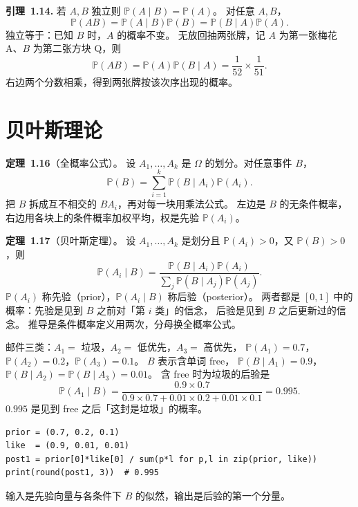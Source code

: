 \noindent\textbf{引理~1.14.}
若 $A,B$ 独立则 $\mathbb{P}(A\mid B)=\mathbb{P}(A)$。
对任意 $A,B$，
\begin{equation}
\mathbb{P}(AB)=\mathbb{P}(A\mid B)\mathbb{P}(B)=\mathbb{P}(B\mid A)\mathbb{P}(A).
\end{equation}
独立等于：已知 $B$ 时，$A$ 的概率不变。
无放回抽两张牌，记 $A$ 为第一张梅花 A、$B$ 为第二张方块 Q，则
\[
\mathbb{P}(AB)=\mathbb{P}(A)\mathbb{P}(B\mid A)=\frac{1}{52}\times\frac{1}{51}.
\]
右边两个分数相乘，得到两张牌按该次序出现的概率。

\section{贝叶斯理论}

\noindent\textbf{定理~1.16}（全概率公式）。
设 $A_1,\ldots,A_k$ 是 $\Omega$ 的划分。对任意事件 $B$，
\begin{equation}
\mathbb{P}(B)=\sum_{i=1}^{k}\mathbb{P}(B\mid A_i)\mathbb{P}(A_i).
\end{equation}
把 $B$ 拆成互不相交的 $BA_i$，再对每一块用乘法公式。
左边是 $B$ 的无条件概率，右边用各块上的条件概率加权平均，权是先验 $\mathbb{P}(A_i)$。

\noindent\textbf{定理~1.17}（贝叶斯定理）。
设 $A_1,\ldots,A_k$ 是划分且 $\mathbb{P}(A_i)>0$，又 $\mathbb{P}(B)>0$，则
\begin{equation}
\mathbb{P}(A_i\mid B)
=\frac{\mathbb{P}(B\mid A_i)\mathbb{P}(A_i)}{\sum_{j}\mathbb{P}(B\mid A_j)\mathbb{P}(A_j)}.
\end{equation}
$\mathbb{P}(A_i)$ 称先验（prior），$\mathbb{P}(A_i\mid B)$ 称后验（posterior）。
两者都是 $[0,1]$ 中的概率：先验是见到 $B$ 之前对「第 $i$ 类」的信念，
后验是见到 $B$ 之后更新过的信念。
推导是条件概率定义用两次，分母换全概率公式。

邮件三类：$A_1=$ 垃圾，$A_2=$ 低优先，$A_3=$ 高优先，
$\mathbb{P}(A_1)=0.7$，$\mathbb{P}(A_2)=0.2$，$\mathbb{P}(A_3)=0.1$。
$B$ 表示含单词 free，
$\mathbb{P}(B\mid A_1)=0.9$，$\mathbb{P}(B\mid A_2)=\mathbb{P}(B\mid A_3)=0.01$。
含 free 时为垃圾的后验是
\[
\mathbb{P}(A_1\mid B)
=\frac{0.9\times 0.7}{0.9\times 0.7+0.01\times 0.2+0.01\times 0.1}=0.995.
\]
$0.995$ 是见到 free 之后「这封是垃圾」的概率。

\begin{lstlisting}
prior = (0.7, 0.2, 0.1)
like  = (0.9, 0.01, 0.01)
post1 = prior[0]*like[0] / sum(p*l for p,l in zip(prior, like))
print(round(post1, 3))  # 0.995
\end{lstlisting}
输入是先验向量与各条件下 $B$ 的似然，输出是后验的第一个分量。

